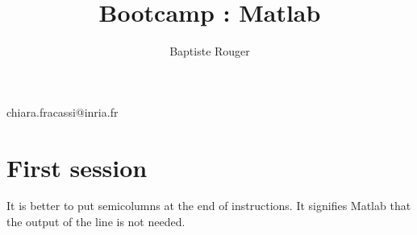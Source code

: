 \documentclass[10pt,a4paper]{article}
\author{Baptiste Rouger}
\title{Bootcamp : Matlab}
\begin{document}
\maketitle

\begin{flushright}
chiara.fracassi@inria.fr
\end{flushright}

\tableofcontents

\newpage

\section{First session}

It is better to put semicolumns at the end of instructions. It signifies Matlab that the output of the line is not needed.


\end{document}
